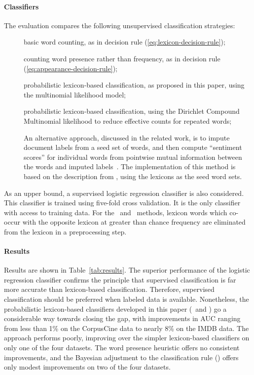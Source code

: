 \paragraph{Classifiers} The evaluation compares the following unsupervised classification strategies:
\begin{description}
\item[] basic word counting, as in decision rule (\ref{eq:lexicon-decision-rule});
\item[] counting word presence rather than frequency, as in decision rule (\ref{eq:appearance-decision-rule});
\item[\sysmult] probabilistic lexicon-based classification, as proposed in this paper, using the multinomial likelihood model;
\item[\sysdcm] probabilistic lexicon-based classification, using the Dirichlet Compound Multinomial likelihood to reduce effective counts for repeated words;
\item[] An alternative approach, discussed in the related work, is to impute document labels from a seed set of words, and then compute ``sentiment scores'' for individual words from pointwise mutual information between the words and imputed labels~\cite{turney2002thumbs}. The implementation of this method is based on the description from , using the lexicons as the seed word sets.
\end{description}

As an upper bound, a supervised logistic regression classifier is also considered. This classifier is trained using five-fold cross validation. It is the only classifier with access to training data. For the \sysmult\ and \sysdcm\ methods, lexicon words which co-occur with the opposite lexicon at greater than chance frequency are eliminated from the lexicon in a preprocessing step.

\paragraph{Results}
Results are shown in Table~\ref{tab:results}. The superior performance of the logistic regression classifier confirms the principle that supervised classification is far more accurate than lexicon-based classification. Therefore, supervised classification should be preferred when labeled data is available. Nonetheless, the probabilistic lexicon-based classifiers developed in this paper (\sysmult\ and \sysdcm) go a considerable way towards closing the gap, with improvements in AUC ranging from less than 1\% on the CorpusCine data to nearly 8\% on the IMDB data. The  approach performs poorly, improving over the simpler lexicon-based classifiers on only one of the four datasets. The word presence heuristic offers no consistent improvements, and the Bayesian adjustment to the classification rule (\sysdcm) offers only modest improvements on two of the four datasets.

